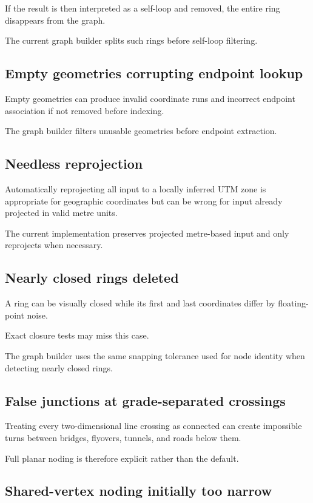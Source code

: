 \documentclass[11pt]{article}
\begin{document}
If the result is then interpreted as a self-loop and removed, the entire ring
disappears from the graph.

The current graph builder splits such rings before self-loop filtering.

\subsection{Empty geometries corrupting endpoint lookup}

Empty geometries can produce invalid coordinate runs and incorrect endpoint
association if not removed before indexing.

The graph builder filters unusable geometries before endpoint extraction.

\subsection{Needless reprojection}

Automatically reprojecting all input to a locally inferred UTM zone is
appropriate for geographic coordinates but can be wrong for input already
projected in valid metre units.

The current implementation preserves projected metre-based input and only
reprojects when necessary.

\subsection{Nearly closed rings deleted}

A ring can be visually closed while its first and last coordinates differ by
floating-point noise.

Exact closure tests may miss this case.

The graph builder uses the same snapping tolerance used for node identity when
detecting nearly closed rings.

\subsection{False junctions at grade-separated crossings}

Treating every two-dimensional line crossing as connected can create impossible
turns between bridges, flyovers, tunnels, and roads below them.

Full planar noding is therefore explicit rather than the default.

\subsection{Shared-vertex noding initially too narrow}
\end{document}
